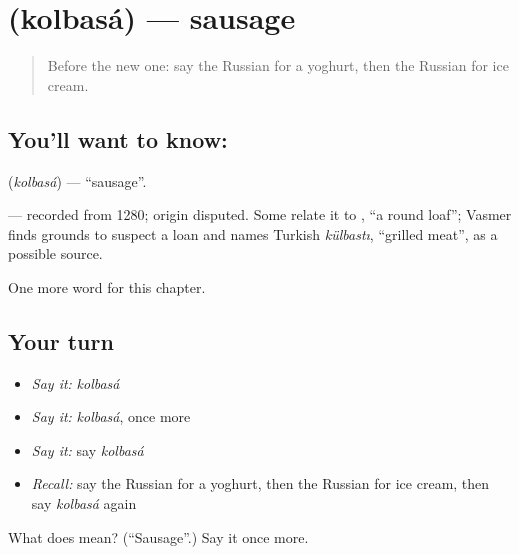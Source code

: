 \section[\texorpdfstring{\ru{колбаса} (kolbasá)}{колбаса (kolbasá)}]{ (kolbasá) — sausage}

\label{lesson:RU-C106-sausage}



\begin{quote}
Before the new one: say the Russian for a yoghurt, then the Russian for ice cream.
\end{quote}

\subsection*{You'll want to know: }
\textbf{} (\emph{kolbasá}) — \textquotedblleft{}sausage\textquotedblright{}.

\begin{cousinweb}
\textbf{} — recorded from 1280; origin disputed. Some relate it to \emph{}, \textquotedblleft{}a round loaf\textquotedblright{}; Vasmer finds grounds to suspect a loan and names Turkish \emph{külbastı}, \textquotedblleft{}grilled meat\textquotedblright{}, as a possible source.
\end{cousinweb}

\begin{grammarlens}[title={What you've built}]
One more word for this chapter.
\end{grammarlens}

\subsection*{Your turn}
\begin{itemize}
\raggedright
  \item \emph{Say it:} \emph{kolbasá}
  \item \emph{Say it:} \emph{kolbasá}, once more
  \item \emph{Say it:} say \emph{kolbasá}
  \item \emph{Recall:} say the Russian for a yoghurt, then the Russian for ice cream, then say \emph{kolbasá} again
\end{itemize}

\begin{tcolorbox}[breakable,colback=teal!4,colframe=teal!35!black,title={Before you move on}]
What does  mean? (\textquotedblleft{}Sausage\textquotedblright{}.) Say it once more.
\end{tcolorbox}

